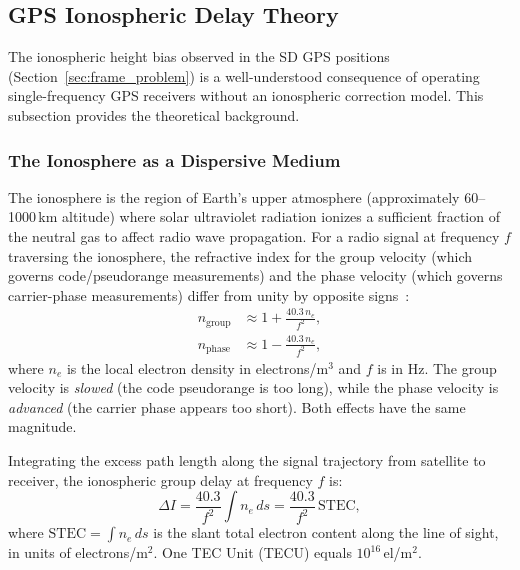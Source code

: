 \subsection{GPS Ionospheric Delay Theory}
\label{sec:iono_theory}

The ionospheric height bias observed in the SD GPS positions (Section~\ref{sec:frame_problem}) is a well-understood consequence of operating single-frequency GPS receivers without an ionospheric correction model. This subsection provides the theoretical background.

\subsubsection{The Ionosphere as a Dispersive Medium}

The ionosphere is the region of Earth's upper atmosphere (approximately 60--1000\,km altitude) where solar ultraviolet radiation ionizes a sufficient fraction of the neutral gas to affect radio wave propagation. For a radio signal at frequency $f$ traversing the ionosphere, the refractive index for the group velocity (which governs code/pseudorange measurements) and the phase velocity (which governs carrier-phase measurements) differ from unity by opposite signs~\cite{misra2006,hofmann2008}:
\begin{align}
n_{\text{group}} &\approx 1 + \frac{40.3\,n_e}{f^2}, \label{eq:n_group}\\[4pt]
n_{\text{phase}} &\approx 1 - \frac{40.3\,n_e}{f^2}, \label{eq:n_phase}
\end{align}
where $n_e$ is the local electron density in electrons/m$^3$ and $f$ is in Hz. The group velocity is \emph{slowed} (the code pseudorange is too long), while the phase velocity is \emph{advanced} (the carrier phase appears too short). Both effects have the same magnitude.

Integrating the excess path length along the signal trajectory from satellite to receiver, the ionospheric group delay at frequency $f$ is:
\begin{equation}
\Delta I = \frac{40.3}{f^2}\int n_e\,ds = \frac{40.3}{f^2}\,\text{STEC},
\label{eq:iono_delay}
\end{equation}
where $\text{STEC} = \int n_e\,ds$ is the slant total electron content along the line of sight, in units of electrons/m$^2$. One TEC Unit (TECU) equals $10^{16}$\,el/m$^2$.

